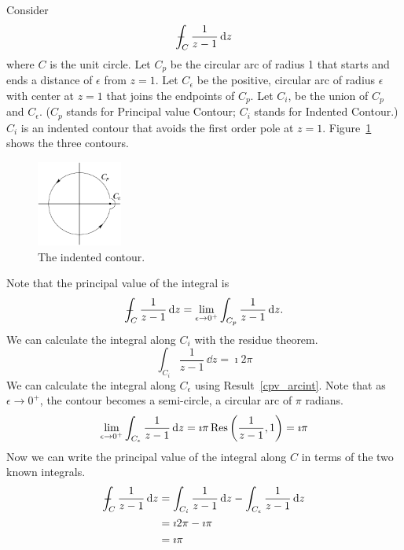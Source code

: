 \begin{Example}
  \label{cpv_exind}
  Consider 
  \[
  - \negthickspace \negthickspace \negthickspace \negmedspace \int_C \frac{1}{z-1} \,\mathrm{d} z
  \]
  where $C$ is the unit circle.
  Let $C_p$ be the circular arc of radius 1 that starts and ends a distance
  of $\epsilon$ from $z=1$.  Let $C_\epsilon$ be the positive,
  circular arc of radius $\epsilon$ with center at $z=1$ that joins the endpoints
  of $C_p$.  Let $C_i$, be the union of $C_p$ and $C_\epsilon$.  ($C_p$ stands
  for Principal value Contour; $C_i$ stands for Indented Contour.)  $C_i$ is
  an indented contour that avoids the first order pole at $z=1$.  
  Figure~\ref{cpv_cpce} shows the three contours.

  \begin{figure}[tb!]
    \begin{center}
      \includegraphics[width=0.25\textwidth]{fcv/residue/cpv_cpce}
    \end{center}
    \caption{The indented contour.}
    \label{cpv_cpce}
  \end{figure}

  Note that the principal value of the integral is
  \[
  - \negthickspace \negthickspace \negthickspace \negmedspace \int_C \frac{1}{z-1} \,\mathrm{d} z
  = \lim_{\epsilon \to 0^+} \int_{C_p} \frac{1}{z-1} \,\mathrm{d} z.
  \]
  We can calculate the integral along $C_i$ with the residue theorem.
  \[
  \int_{C_i} \frac{1}{z-1} \,\dd z = \imath 2 \pi
  \]
  We can calculate the integral along $C_\epsilon$ using Result~\ref{cpv_arcint}.
  Note that as $\epsilon \to 0^+$, the contour becomes a semi-circle, a 
  circular arc of $\pi$ radians.
  \[
  \lim_{\epsilon \to 0^+} \int_{C_\epsilon} \frac{1}{z-1} \,\mathrm{d} z
  = \imath \pi \mathop{\mathrm{Res}}\nolimits\left( \frac{1}{z-1}, 1 \right) = \imath \pi
  \]
  Now we can write the principal value of the integral along $C$ in terms of
  the two known integrals.
  \begin{align*}
    - \negthickspace \negthickspace \negthickspace \negmedspace \int_C \frac{1}{z-1} \,\mathrm{d} z 
    &= \int_{C_i} \frac{1}{z-1} \,\mathrm{d} z
    - \int_{C_\epsilon} \frac{1}{z-1} \,\mathrm{d} z \\
    &= \imath 2 \pi - \imath \pi \\
    &= \imath \pi
  \end{align*}
\end{Example}



